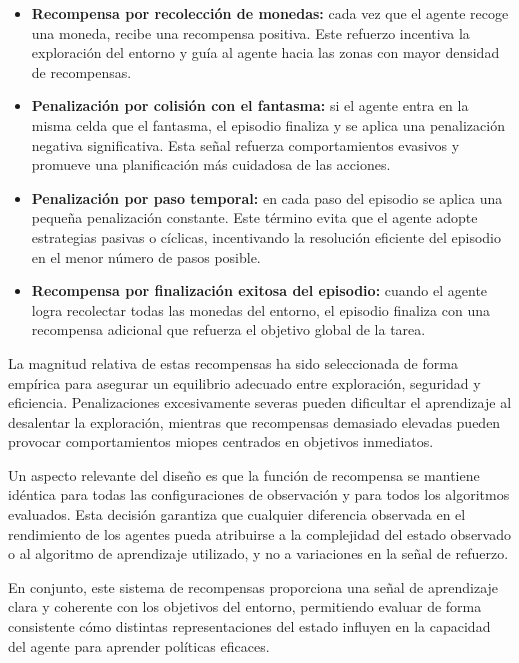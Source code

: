 \begin{itemize}
    \item \textbf{Recompensa por recolección de monedas:} cada vez que el agente recoge una moneda, recibe una recompensa positiva. Este refuerzo incentiva la exploración del entorno y guía al agente hacia las zonas con mayor densidad de recompensas.
    
    \item \textbf{Penalización por colisión con el fantasma:} si el agente entra en la misma celda que el fantasma, el episodio finaliza y se aplica una penalización negativa significativa. Esta señal refuerza comportamientos evasivos y promueve una planificación más cuidadosa de las acciones.
    
    \item \textbf{Penalización por paso temporal:} en cada paso del episodio se aplica una pequeña penalización constante. Este término evita que el agente adopte estrategias pasivas o cíclicas, incentivando la resolución eficiente del episodio en el menor número de pasos posible.
    
    \item \textbf{Recompensa por finalización exitosa del episodio:} cuando el agente logra recolectar todas las monedas del entorno, el episodio finaliza con una recompensa adicional que refuerza el objetivo global de la tarea.
\end{itemize}

La magnitud relativa de estas recompensas ha sido seleccionada de forma empírica para asegurar un equilibrio adecuado entre exploración, seguridad y eficiencia. Penalizaciones excesivamente severas pueden dificultar el aprendizaje al desalentar la exploración, mientras que recompensas demasiado elevadas pueden provocar comportamientos miopes centrados en objetivos inmediatos.

Un aspecto relevante del diseño es que la función de recompensa se mantiene idéntica para todas las configuraciones de observación y para todos los algoritmos evaluados. Esta decisión garantiza que cualquier diferencia observada en el rendimiento de los agentes pueda atribuirse a la complejidad del estado observado o al algoritmo de aprendizaje utilizado, y no a variaciones en la señal de refuerzo.

En conjunto, este sistema de recompensas proporciona una señal de aprendizaje clara y coherente con los objetivos del entorno, permitiendo evaluar de forma consistente cómo distintas representaciones del estado influyen en la capacidad del agente para aprender políticas eficaces.


